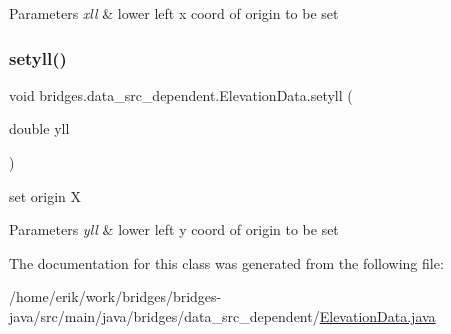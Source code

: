\begin{DoxyParams}{Parameters}
{\em xll} & lower left x coord of origin to be set \\
\hline
\end{DoxyParams}
\mbox{\label{classbridges_1_1data__src__dependent_1_1_elevation_data_a5a047e02c5d0acf9bf6d4b45086ae1cc}} 
\subsubsection{\texorpdfstring{setyll()}{setyll()}}
{\footnotesize\ttfamily void bridges.\+data\+\_\+src\+\_\+dependent.\+Elevation\+Data.\+setyll (\begin{DoxyParamCaption}\item[{double}]{yll }\end{DoxyParamCaption})}

set origin X


\begin{DoxyParams}{Parameters}
{\em yll} & lower left y coord of origin to be set \\
\hline
\end{DoxyParams}


The documentation for this class was generated from the following file\+:\begin{DoxyCompactItemize}
\item 
/home/erik/work/bridges/bridges-\/java/src/main/java/bridges/data\+\_\+src\+\_\+dependent/\hyperlink{_elevation_data_8java}{Elevation\+Data.\+java}\end{DoxyCompactItemize}
